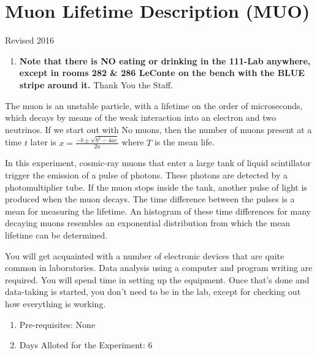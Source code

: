 \documentclass{../lab}
\begin{document}
\maketitle

\tableofcontents

\section{Muon Lifetime Description (MUO)}

Revised 2016

\begin{enumerate}
    \item \textbf{Note that there is NO eating or drinking in the 111-Lab anywhere, except in rooms 282 \& 286 LeConte on the bench with the BLUE stripe around it.} Thank You the Staff.

\end{enumerate}

The muon is an unstable particle, with a lifetime on the order of microseconds, which decays by means of the weak interaction into an electron and two neutrinos. If we start out with No muons, then the number of muons present at a time $t$ later is $x = \frac{-b \pm \sqrt{b^2-4ac}}{2a}$ where $T$ is the mean life.

In this experiment, cosmic-ray muons that enter a large tank of liquid scintillator trigger the emission of a pulse of photons. These photons are detected by a photomultiplier tube. If the muon stops inside the tank, another pulse of light is produced when the muon decays. The time difference between the pulses is a mean for measuring the lifetime. An histogram of these time differences for many decaying muons resembles an exponential distribution from which the mean lifetime can be determined.

You will get acquainted with a number of electronic devices that are quite common in laboratories. Data analysis using a computer and program writing are required. You will spend time in setting up the equipment. Once that's done and data-taking is started, you don't need to be in the lab, except for checking out how everything is working.

\begin{enumerate}
    \item Pre-requisites: None

    \item Days Alloted for the Experiment: 6
\end{enumerate}
\end{document}
